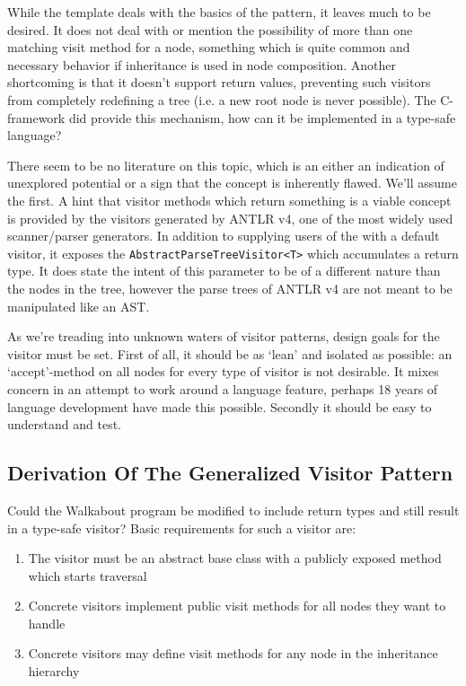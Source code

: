 \documentclass[twoside,openright]{uva-bachelor-thesis}
\newcommand{\code}[1]{\texttt{\footnotesize#1}}
\begin{document}
			While the template deals with the basics of the pattern, it leaves much to be desired. It does not deal with or mention the possibility of more than one matching visit method for a node, something which is quite common and necessary behavior if inheritance is used in node composition. Another shortcoming is that it doesn't support return values, preventing such visitors from completely redefining a tree (i.e. a new root node is never possible). The C-framework did provide this mechanism, how can it be implemented in a type-safe language?
			
			There seem to be no literature on this topic, which is an either an indication of unexplored potential or a sign that the concept is inherently flawed. We'll assume the first. A hint that visitor methods which return something is a viable concept is provided by the visitors generated by ANTLR v4, one of the most widely used scanner/parser generators\cite{website:antlr4}. In addition to supplying users of the with a default visitor, it exposes the \code{AbstractParseTreeVisitor<T>} which accumulates a return type. It does state the intent of this parameter to be of a different nature than the nodes in the tree, however the parse trees of ANTLR v4 are not meant to be manipulated like an AST.
			
			As we're treading into unknown waters of visitor patterns, design goals for the visitor must be set. First of all, it should be as `lean' and isolated as possible: an `accept'-method on all nodes for every type of visitor is not desirable. It mixes concern in an attempt to work around a language feature, perhaps 18 years of language development have made this possible. Secondly it should be easy to understand and test.
			
		\subsection{Derivation Of The Generalized Visitor Pattern}
		\label{gen-vis-deriv}
			Could the Walkabout program be modified to include return types and still result in a type-safe visitor? Basic requirements for such a visitor are:
			\begin{enumerate}
				\item The visitor must be an abstract base class with a publicly exposed method which starts traversal
				\item Concrete visitors implement public visit methods for all nodes they want to handle
				\item Concrete visitors may define visit methods for any node in the inheritance hierarchy
			\end{enumerate}
			
\end{document}
